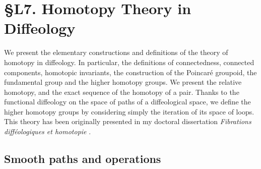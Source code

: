 
\chapter*{\S L7. Homotopy Theory in Diffeology}
\setcounter{footnote}{0}

\begin{abstract}
  This lecture is about homotopy theory in diffeology,
  that generalizes to diffeological spaces the theory of homotopy on Euclidean domains,
  and encompasses the geometric theory of homotopy of manifolds.
  In these times when homotopy can have more than one meaning,
  this theory of homotopy should be understood as the historic version of homotopy,
  built from loops.
  We can specify if necessary and call it the ``geometric homotopy theory of diffeological spaces''.
\end{abstract}


We present the elementary constructions and definitions of the theory of homotopy in diffeology.
In particular,
the definitions of connectedness,
connected components,
homotopic invariants,
the construction of the Poincar\'e groupoid,
the fundamental group and the higher homotopy groups.
We present the relative homotopy,
and the exact sequence of the homotopy of a pair.
Thanks to the functional diffeology on the space of paths of a diffeological space,
we define the higher homotopy groups by considering simply the iteration of its space of loops.
This theory has been originally presented in my doctoral dissertation {\em Fibrations diff\'eologiques et homotopie} \cite{Igl85}.

\section{Smooth paths and operations}

